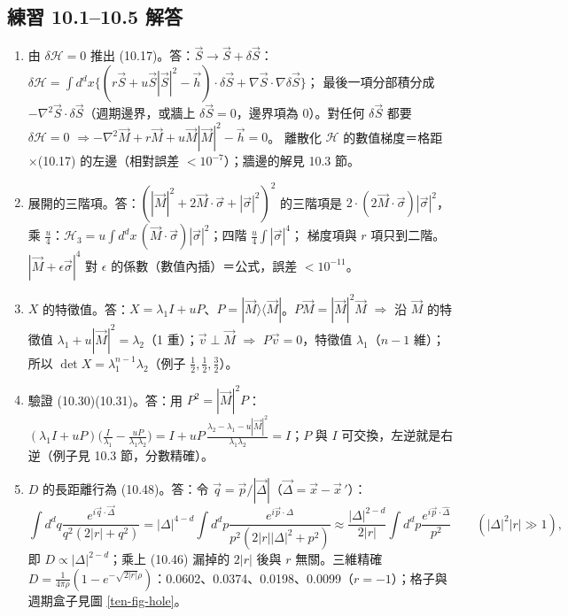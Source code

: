 \subsection{練習 10.1--10.5 解答}
{\small
\begin{enumerate}[label=\textbf{10.\arabic*},itemsep=0.05em]
\item 由 $\delta\mathcal H=0$ 推出 (10.17)。\quad 答：$\vec S\to\vec S+\delta\vec S$：$\delta\mathcal H=\int d^dx\{(r\vec S+u\vec S|\vec S|^2-\vec h)\cdot\delta\vec S+\nabla\vec S\cdot\nabla\delta\vec S\}$；
最後一項分部積分成 $-\nabla^2\vec S\cdot\delta\vec S$（週期邊界，或牆上 $\delta\vec S=0$，邊界項為 0）。對任何 $\delta\vec S$ 都要 $\delta\mathcal H=0$ $\Rightarrow-\nabla^2\vec M+r\vec M+u\vec M|\vec M|^2-\vec h=0$。
離散化 $\mathcal H$ 的數值梯度＝格距 $\times$(10.17) 的左邊（相對誤差 $<10^{-7}$）；牆邊的解見 10.3 節。
\item 展開的三階項。\quad 答：$(|\vec M|^2+2\vec M\cdot\vec\sigma+|\vec\sigma|^2)^2$ 的三階項是 $2\cdot(2\vec M\cdot\vec\sigma)|\vec\sigma|^2$，乘 $\frac u4$：$\mathcal H_3=u\int d^dx\,(\vec M\cdot\vec\sigma)|\vec\sigma|^2$；四階 $\frac u4\int|\vec\sigma|^4$；
梯度項與 $r$ 項只到二階。$|\vec M+\epsilon\vec\sigma|^4$ 對 $\epsilon$ 的係數（數值內插）＝公式，誤差 $<10^{-11}$。
\item $X$ 的特徵值。\quad 答：$X=\lambda_1I+uP$、$P=|\vec M\rangle\langle\vec M|$。$P\vec M=|\vec M|^2\vec M$ $\Rightarrow$ 沿 $\vec M$ 的特徵值 $\lambda_1+u|\vec M|^2=\lambda_2$（1 重）；$\vec v\perp\vec M$ $\Rightarrow$ $P\vec v=0$，特徵值 $\lambda_1$（$n-1$ 維）；
所以 $\det X=\lambda_1^{n-1}\lambda_2$（例子 $\frac12,\frac12,\frac32$）。
\item 驗證 (10.30)(10.31)。\quad 答：用 $P^2=|\vec M|^2P$：$(\lambda_1I+uP)\big(\frac I{\lambda_1}-\frac{uP}{\lambda_1\lambda_2}\big)=I+uP\,\frac{\lambda_2-\lambda_1-u|\vec M|^2}{\lambda_1\lambda_2}=I$；$P$ 與 $I$ 可交換，左逆就是右逆（例子見 10.3 節，分數精確）。
\item $D$ 的長距離行為 (10.48)。\quad 答：令 $\vec q=\vec p/|\vec\Delta|$（$\vec\Delta=\vec x-\vec x\,'$）：
\[\int d^dq\frac{e^{i\vec q\cdot\vec\Delta}}{q^2(2|r|+q^2)}=|\Delta|^{4-d}\int d^dp\frac{e^{i\vec p\cdot\hat\Delta}}{p^2(2|r||\Delta|^2+p^2)}\approx\frac{|\Delta|^{2-d}}{2|r|}\int d^dp\frac{e^{i\vec p\cdot\hat\Delta}}{p^2}\qquad(|\Delta|^2|r|\gg1),\]
即 $D\propto|\Delta|^{2-d}$；乘上 (10.46) 漏掉的 $2|r|$ 後與 $r$ 無關。三維精確 $D=\frac1{4\pi\rho}(1-e^{-\sqrt{2|r|}\rho})$：0.0602、0.0374、0.0198、0.0099（$r=-1$）；格子與週期盒子見圖 \ref{ten-fig-hole}。
\end{enumerate}}

